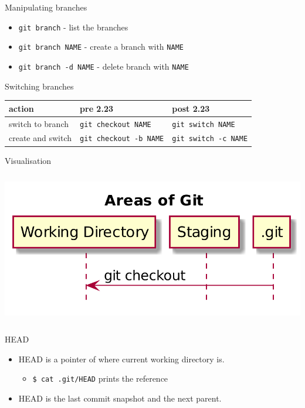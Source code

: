 \documentclass[presentation,aspectratio=169,smaller]{beamer}
\begin{document}
\begin{frame}[label={sec:org344bd51},fragile]{Manipulating branches}
 \begin{itemize}
\item \texttt{git branch} - list the branches
\item \texttt{git branch NAME} - create a branch with \texttt{NAME}
\item \texttt{git branch -d NAME} - delete branch with \texttt{NAME}
\end{itemize}
\end{frame}

\begin{frame}[label={sec:org6f2d888},fragile]{Switching branches}
 \begin{center}
\begin{tabular}{lll}
action & pre 2.23 & post 2.23\\
\hline
switch to branch & \texttt{git checkout NAME} & \texttt{git switch NAME}\\
create and switch & \texttt{git checkout -b NAME} & \texttt{git switch -c NAME}\\
\end{tabular}
\end{center}
\end{frame}

\begin{frame}[label={sec:orgd96de04}]{Visualisation}
\begin{center}
\includegraphics[height=6.7cm]{images/git-checkout-0.png}
\end{center}
\end{frame}

\begin{frame}[label={sec:orgf4605d7},fragile]{HEAD}
 \begin{itemize}
\item HEAD is a pointer of where current working directory is.
\begin{itemize}
\item \texttt{\$ cat .git/HEAD} prints the reference
\end{itemize}
\item HEAD is the last commit snapshot and the next parent.
\end{itemize}
\end{frame}
\end{document}

